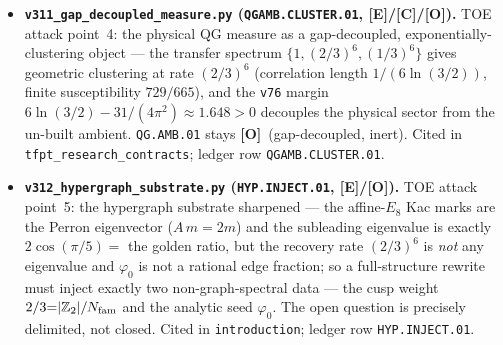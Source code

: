 \documentclass[11pt]{article}
\providecommand{\mE}{\textbf{[E]}}\providecommand{\mC}{\textbf{[C]}}
\providecommand{\mO}{\textbf{[O]}}\providecommand{\mX}{\textbf{[X]}}
\begin{document}
\begin{itemize}
  pins the RG. Closes the spectrum/anomaly/$\beta$ sub-question; the interacting Epstein--Glaser $S$-matrix and the
  Yukawa sector stay \mC/\mO. Cited in \texttt{tfpt\_research\_contracts}; ledger row \texttt{CAR.SM.ANOM.01}.
\item \textbf{\texttt{v311\_gap\_decoupled\_measure.py} (\texttt{QGAMB.CLUSTER.01}, \mE/\mC/\mO).} TOE attack point~4:
  the physical QG measure as a gap-decoupled, exponentially-clustering object --- the transfer spectrum
  $\{1,(2/3)^6,(1/3)^6\}$ gives geometric clustering at rate $(2/3)^6$ (correlation length $1/(6\ln(3/2))$, finite
  susceptibility $729/665$), and the \texttt{v76} margin $6\ln(3/2)-31/(4\pi^2){\approx}1.648{>}0$ decouples the
  physical sector from the un-built ambient. \texttt{QG.AMB.01} stays \mO\ (gap-decoupled, inert). Cited in
  \texttt{tfpt\_research\_contracts}; ledger row \texttt{QGAMB.CLUSTER.01}.
\item \textbf{\texttt{v312\_hypergraph\_substrate.py} (\texttt{HYP.INJECT.01}, \mE/\mO).} TOE attack point~5: the
  hypergraph substrate sharpened --- the affine-$E_8$ Kac marks are the Perron eigenvector ($A\,m{=}2m$) and the
  subleading eigenvalue is exactly $2\cos(\pi/5)=$ the golden ratio, but the recovery rate $(2/3)^6$ is \emph{not}
  any eigenvalue and $\varphi_0$ is not a rational edge fraction; so a full-structure rewrite must inject exactly two
  non-graph-spectral data --- the cusp weight $2/3{=}|\mathbb Z_2|/N_{\mathrm{fam}}$ and the analytic seed $\varphi_0$. The open
  question is precisely delimited, not closed. Cited in \texttt{introduction}; ledger row \texttt{HYP.INJECT.01}.
\end{itemize}
\end{document}
